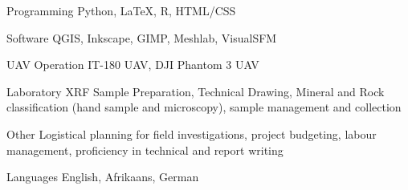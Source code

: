 


\begin{cvskills}


\cvskill
{Programming} %
{Python, LaTeX, R, HTML/CSS} %


\cvskill
{Software} %
{QGIS, Inkscape, GIMP, Meshlab, VisualSFM} %


\cvskill
{UAV Operation} %
{IT-180 UAV, DJI Phantom 3 UAV} %


\cvskill
{Laboratory}
{XRF Sample Preparation, Technical Drawing, Mineral and Rock classification (hand sample and microscopy),}
\cvskill
{}
{sample management and collection}


\cvskill
{Other}
{Logistical planning for field investigations, project budgeting, labour management, proficiency in technical}
\cvskill
{}
{and report writing}


\cvskill
{Languages} %
{English, Afrikaans, German} %


\end{cvskills}